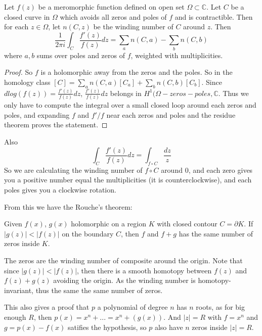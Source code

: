 \documentclass[main.tex]{subfiles}
\begin{document}
\begin{theorem}
Let $f(z)$ be a meromorphic function defined on open set $\Omega \subset \mathbb{C}$. Let $C$ be a closed curve in $\Omega$ which avoids all zeros and poles of $f$ and is contractible. Then for each $z \in \Omega$, let $n(C,z)$ be the winding number of $C$ around $z$. Then 
$$
\frac{1}{2\pi i} \int_C \frac{f'(z)}{f(z)} dz = \sum_a n(C,a) - \sum_b n(C,b)
$$
where $a, b$ sums over poles and zeros of $f$, weighted with multiplicities.
\end{theorem}

\begin{proof}
So $f$ is a holomorphic away from the zeros and the poles. So in the homology class $[C] = \sum_a n(C,a) [C_a] + \sum_b n(C, b) [C_b]$. Since $d log(f(z)) =\frac{f'(z)}{f(z)} dz$, $\frac{f'(z)}{f(z)} dz$ belongs in $H^1(\Omega - zeros - poles, \mathbb{C}$. Thus we only have to compute the integral over a small closed loop around each zeros and poles, and expanding $f$ and $f'/f$ near each zeros and poles and the residue theorem proves the statement.
\end{proof}

\begin{remark}
Also 
$$
\int_C \frac{f'(z)}{f(z)} dz = \int_{f \circ C} \frac{dz}{z}
$$
So we are calculating the winding number of $f \circ C$ around $0$, and each zero gives you a positive number equal the multiplicities (it is counterclockwise), and each poles gives you a clockwise rotation.
\end{remark}

From this we have the Rouche's theorem:

\begin{theorem}
Given $f(x)$, $g(x)$ holomorphic on a region $K$ with closed contour $C = \partial K$. If $|g(z)| < |f(z)|$ on the boundary $C$, then $f$ and $f + g$ has the same number of zeros inside $K$.
\end{theorem}

\begin{theorem}
The zeros are the winding number of composite around the origin. Note that since $|g(z)| < |f(z)|$, then there is a smooth homotopy between $f(z)$ and $f(z) + g(z)$ avoiding the origin. As the winding number is homotopy-invariant, thus the same the same number of zeros.
\end{theorem}

\begin{remark}
This also gives a proof that $p$ a polynomial of degree $n$ has $n$ roots, as for big enough $R$, then $p(x) = x^n + ... = x^n + (g(x))$. And $|z| = R$ with $f = x^n$ and $g = p(x) - f(x)$ satifies the hypothesis, so $p$ also have $n$ zeros inside $|z| = R$.
\end{remark}
\end{document}
